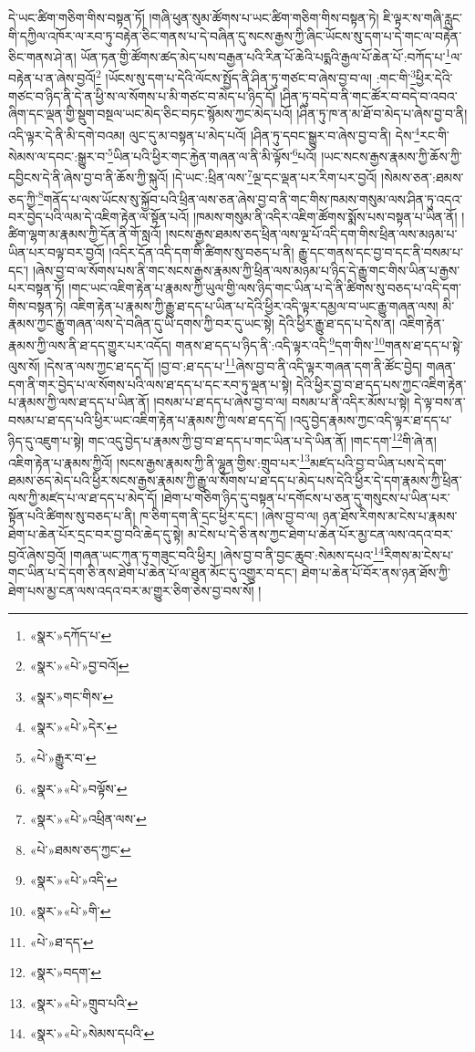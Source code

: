 དེ་ཡང་ཚིག་གཅིག་གིས་བསྟན་ཏོ། །གཞི་ཕུན་སུམ་ཚོགས་པ་ཡང་ཚིག་གཅིག་གིས་བསྟན་ཏེ། ཇི་ལྟར་ས་གཞི་རླུང་གི་དཀྱིལ་འཁོར་ལ་རབ་ཏུ་བརྟེན་ཅིང་གནས་པ་དེ་བཞིན་དུ་སངས་རྒྱས་ཀྱི་ཞིང་ཡོངས་སུ་དག་པ་དེ་གང་ལ་བརྟེན་ཅིང་གནས་ཤེ་ན། ཡོན་ཏན་གྱི་ཚོགས་ཚད་མེད་པས་བརྒྱན་པའི་རིན་པོ་ཆེའི་པདྨའི་རྒྱལ་པོ་ཆེན་པོ་:བཀོད་པ་\footnote{«སྣར་»དཀོད་པ་}ལ་བརྟེན་པ་ན་ཞེས་བྱའོ།\footnote{«སྣར་»«པེ་»བྱ་བའོ།} །ཡོངས་སུ་དག་པ་དེའི་ལོངས་སྤྱོད་ནི་ཤིན་ཏུ་གཙང་བ་ཞེས་བྱ་བ་ལ། :གང་གི་\footnote{«སྣར་»གང་གིས་}ཕྱིར་དེའི་གཙང་བ་ཉིད་ནི་དེ་ན་ཕྱི་ས་ལ་སོགས་པ་མི་གཙང་བ་མེད་པ་ཉིད་དོ། །ཤིན་ཏུ་བདེ་བ་ནི་གང་ཚོར་བ་བདེ་བ་འབའ་ཞིག་དང་ལྡན་གྱི་སྡུག་བསྔལ་ཡང་མེད་ཅིང་བཏང་སྙོམས་ཀྱང་མེད་པའོ། །ཤིན་ཏུ་ཁ་ན་མ་ཐོ་བ་མེད་པ་ཞེས་བྱ་བ་ནི། འདི་ལྟར་དེ་ནི་མི་དགེ་བའམ། ལུང་དུ་མ་བསྟན་པ་མེད་པའོ། །ཤིན་ཏུ་དབང་སྒྱུར་བ་ཞེས་བྱ་བ་ནི། དེས་\footnote{«སྣར་»«པེ་»དེར་}རང་གི་སེམས་ལ་དབང་:སྒྱུར་བ་\footnote{«པེ་»རྒྱུར་བ་}ཡིན་པའི་ཕྱིར་གང་རྐྱེན་གཞན་ལ་ནི་མི་ལྟོས་\footnote{«སྣར་»«པེ་»བལྟོས་}པའོ། །ཡང་སངས་རྒྱས་རྣམས་ཀྱི་ཆོས་ཀྱི་དབྱིངས་དེ་ནི་ཞེས་བྱ་བ་ནི་ཆོས་ཀྱི་སྐུའོ། །དེ་ཡང་:ཕྲིན་ལས་\footnote{«སྣར་»«པེ་»འཕྲིན་ལས་}ལྔ་དང་ལྡན་པར་རིག་པར་བྱའོ། །སེམས་ཅན་:ཐམས་ཅད་ཀྱི་\footnote{«པེ་»ཐམས་ཅད་ཀྱང་}གནོད་པ་ལས་ཡོངས་སུ་སྐྱོབ་པའི་ཕྲིན་ལས་ཅན་ཞེས་བྱ་བ་ནི་གང་གིས་ཁམས་གསུམ་ལས་ཤིན་ཏུ་འདའ་བར་བྱེད་པའི་ལམ་དེ་འཇིག་རྟེན་ལ་སྟོན་པའོ། །ཁམས་གསུམ་ནི་འདིར་འཇིག་ཚོགས་སྨོས་པས་བསྟན་པ་ཡིན་ནོ། །ཚིག་ལྷག་མ་རྣམས་ཀྱི་དོན་ནི་གོ་སླའོ། །སངས་རྒྱས་ཐམས་ཅད་ཕྲིན་ལས་ལྔ་པོ་འདི་དག་གིས་ཕྲིན་ལས་མཉམ་པ་ཡིན་པར་བལྟ་བར་བྱའོ། །འདིར་དོན་འདི་དག་གི་ཚིགས་སུ་བཅད་པ་ནི། རྒྱུ་དང་གནས་དང་བྱ་བ་དང་ནི་བསམ་པ་དང་། །ཞེས་བྱ་བ་ལ་སོགས་པས་ནི་གང་སངས་རྒྱས་རྣམས་ཀྱི་ཕྲིན་ལས་མཉམ་པ་ཉིད་དེ་རྒྱུ་གང་གིས་ཡིན་པ་རྒྱས་པར་བསྟན་ཏོ། །གང་ཡང་འཇིག་རྟེན་པ་རྣམས་ཀྱི་ཡུལ་གྱི་ལས་ཉིད་གང་ཡིན་པ་དེ་ནི་ཚིགས་སུ་བཅད་པ་འདི་དག་གིས་བསྟན་ཏེ། འཇིག་རྟེན་པ་རྣམས་ཀྱི་རྒྱུ་ཐ་དད་པ་ཡིན་པ་དེའི་ཕྱིར་འདི་ལྟར་དམྱལ་བ་ཡང་རྒྱུ་གཞན་ལས། མི་རྣམས་ཀྱང་རྒྱུ་གཞན་ལས་དེ་བཞིན་དུ་ཡི་དགས་ཀྱི་བར་དུ་ཡང་སྟེ། དེའི་ཕྱིར་རྒྱུ་ཐ་དད་པ་དེས་ན། འཇིག་རྟེན་རྣམས་ཀྱི་ལས་ནི་ཐ་དད་གྱུར་པར་འདོད། གནས་ཐ་དད་པ་ཉིད་ནི་:འདི་ལྟར་འདི་\footnote{«སྣར་»«པེ་»འདི་}དག་གིས་\footnote{«སྣར་»«པེ་»གི་}གནས་ཐ་དད་པ་སྟེ་ལུས་སོ། །དེས་ན་ལས་ཀྱང་ཐ་དད་དོ། །བྱ་བ་:ཐ་དད་པ་\footnote{«པེ་»ཐ་དད་}ཞེས་བྱ་བ་ནི་འདི་ལྟར་གཞན་དག་ནི་ཚོང་བྱེད། གཞན་དག་ནི་གར་བྱེད་པ་ལ་སོགས་པའི་ལས་ཐ་དད་པ་དང་རབ་ཏུ་ལྡན་པ་སྟེ། དེའི་ཕྱིར་བྱ་བ་ཐ་དད་པས་ཀྱང་འཇིག་རྟེན་པ་རྣམས་ཀྱི་ལས་ཐ་དད་པ་ཡིན་ནོ། །བསམ་པ་ཐ་དད་པ་ཞེས་བྱ་བ་ལ། བསམ་པ་ནི་འདིར་མོས་པ་སྟེ། དེ་ལྟ་བས་ན་བསམ་པ་ཐ་དད་པའི་ཕྱིར་ཡང་འཇིག་རྟེན་པ་རྣམས་ཀྱི་ལས་ཐ་དད་དོ། །འདུ་བྱེད་རྣམས་ཀྱང་འདི་ལྟར་ཐ་དད་པ་ཉིད་དུ་འཇུག་པ་སྟེ། གང་འདུ་བྱེད་པ་རྣམས་ཀྱི་བྱ་བ་ཐ་དད་པ་གང་ཡིན་པ་དེ་ཡིན་ནོ། །གང་དག་\footnote{«སྣར་»བདག་}གི་ཞེ་ན། འཇིག་རྟེན་པ་རྣམས་ཀྱིའོ། །སངས་རྒྱས་རྣམས་ཀྱི་ནི་ལྷུན་གྱིས་:གྲུབ་པར་\footnote{«སྣར་»«པེ་»གྲུབ་པའི་}མཛད་པའི་བྱ་བ་ཡིན་པས་དེ་དག་ཐམས་ཅད་མེད་པའི་ཕྱིར་སངས་རྒྱས་རྣམས་ཀྱི་རྒྱུ་ལ་སོགས་པ་ཐ་དད་པ་མེད་པས་དེའི་ཕྱིར་དེ་དག་རྣམས་ཀྱི་ཕྲིན་ལས་ཀྱི་མཛད་པ་ལ་ཐ་དད་པ་མེད་དོ། །ཐེག་པ་གཅིག་ཉིད་དུ་བསྟན་པ་དགོངས་པ་ཅན་དུ་གསུངས་པ་ཡིན་པར་སྟོན་པའི་ཚིགས་སུ་བཅད་པ་ནི། ཁ་ཅིག་དག་ནི་དྲང་ཕྱིར་དང་། །ཞེས་བྱ་བ་ལ། ཉན་ཐོས་རིགས་མ་ངེས་པ་རྣམས་ཐེག་པ་ཆེན་པོར་དྲང་བར་བྱ་བའི་ཆེད་དུ་སྟེ། མ་ངེས་པ་དེ་ཅི་ནས་ཀྱང་ཐེག་པ་ཆེན་པོར་མྱ་ངན་ལས་འདའ་བར་བྱའོ་ཞེས་བྱའོ། །གཞན་ཡང་ཀུན་ཏུ་གཟུང་བའི་ཕྱིར། །ཞེས་བྱ་བ་ནི་བྱང་ཆུབ་:སེམས་དཔའ་\footnote{«སྣར་»«པེ་»སེམས་དཔའི་}རིགས་མ་ངེས་པ་གང་ཡིན་པ་དེ་དག་ཅི་ནས་ཐེག་པ་ཆེན་པོ་ལ་ཐུན་མོང་དུ་འགྱུར་བ་དང་། ཐེག་པ་ཆེན་པོ་བོར་ནས་ཉན་ཐོས་ཀྱི་ཐེག་པས་མྱ་ངན་ལས་འདའ་བར་མ་གྱུར་ཅིག་ཅེས་བྱ་བས་སོ། །
